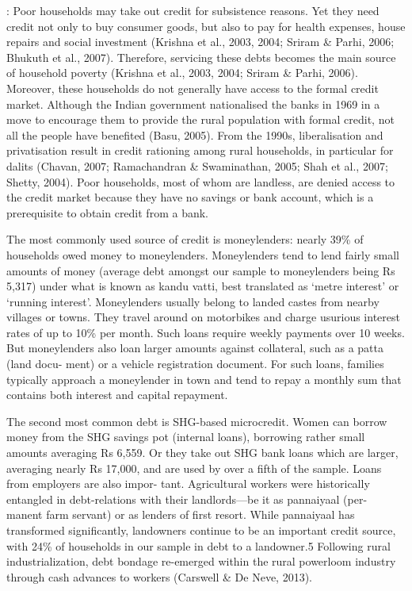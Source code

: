 \documentclass[a4paper, 11pt, onecolumn]{article}
\begin{document}
\cite{Bhukuth2018} : Poor households may take out credit for subsistence reasons. Yet they need credit not
only to buy consumer goods, but also to pay for health expenses, house repairs and social
investment (Krishna et al., 2003, 2004; Sriram \& Parhi, 2006; Bhukuth et al., 2007).
Therefore, servicing these debts becomes the main source of household poverty (Krishna
et al., 2003, 2004; Sriram \& Parhi, 2006).
Moreover, these households do not generally have access to the formal credit market.
Although the Indian government nationalised the banks in 1969 in a move to encourage
them to provide the rural population with formal credit, not all the people have benefited
(Basu, 2005). From the 1990s, liberalisation and privatisation result in credit rationing
among rural households, in particular for dalits (Chavan, 2007; Ramachandran \&
Swaminathan, 2005; Shah et al., 2007; Shetty, 2004). Poor households, most of whom
are landless, are denied access to the credit market because they have no savings or bank
account, which is a prerequisite to obtain credit from a bank.



\cite{Carswell2021}

The most commonly used source of credit is moneylenders: nearly 39\% of
households owed money to moneylenders. Moneylenders tend to lend fairly small amounts of money (average debt
amongst our sample to moneylenders being Rs 5,317) under what is known as kandu vatti, best translated as ‘metre
interest’ or ‘running interest’. Moneylenders usually belong to landed castes from nearby villages or towns. They
travel around on motorbikes and charge usurious interest rates of up to 10\% per month. Such loans require weekly
payments over 10 weeks. But moneylenders also loan larger amounts against collateral, such as a patta (land docu-
ment) or a vehicle registration document. For such loans, families typically approach a moneylender in town and tend
to repay a monthly sum that contains both interest and capital repayment.

The second most common debt is SHG-based microcredit. Women can borrow money from the SHG savings
pot (internal loans), borrowing rather small amounts averaging Rs 6,559. Or they take out SHG bank loans which are
larger, averaging nearly Rs 17,000, and are used by over a fifth of the sample. Loans from employers are also impor-
tant. Agricultural workers were historically entangled in debt-relations with their landlords—be it as pannaiyaal (per-
manent farm servant) or as lenders of first resort. While pannaiyaal has transformed significantly, landowners
continue to be an important credit source, with 24\% of households in our sample in debt to a landowner.5 Following
rural industrialization, debt bondage re-emerged within the rural powerloom industry through cash advances to
workers (Carswell \& De Neve, 2013). 
\end{document}
